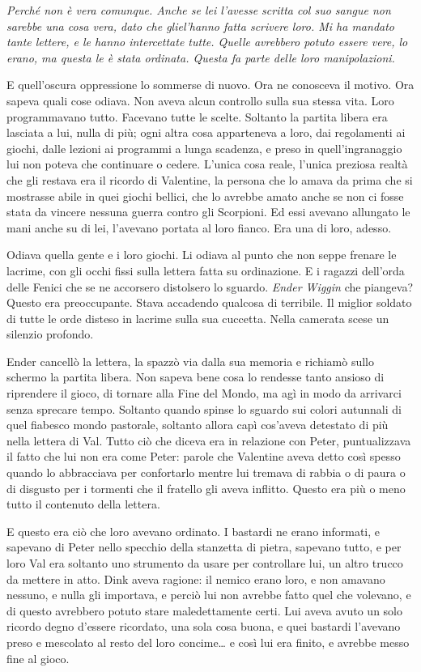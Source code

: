 \emph{{Perché non è vera comunque. Anche se lei l'avesse scritta col suo
		sangue non sarebbe una cosa vera, dato che gliel'hanno fatta scrivere
		loro. Mi ha mandato tante lettere, e le hanno intercettate tutte. Quelle
		avrebbero potuto essere vere, lo erano, ma questa le è stata ordinata.
		Questa fa parte delle loro manipolazioni.}}

{E quell'oscura oppressione lo sommerse di nuovo. Ora ne conosceva il
	motivo. Ora sapeva quali cose odiava. Non aveva alcun controllo sulla
	sua stessa vita. Loro programmavano tutto. Facevano tutte le scelte.
	Soltanto la partita libera era lasciata a lui, nulla di più; ogni altra
	cosa apparteneva a loro, dai regolamenti ai giochi, dalle lezioni ai
	programmi a lunga scadenza, e preso in quell'ingranaggio lui non poteva
	che continuare o cedere. L'unica cosa reale, l'unica preziosa realtà che
	gli restava era il ricordo di Valentine, la persona che lo amava da
	prima che si mostrasse abile in quei giochi bellici, che lo avrebbe
	amato anche se non ci fosse stata da vincere nessuna guerra contro gli
	Scorpioni. Ed essi avevano allungato le mani anche su di lei, l'avevano
	portata al loro fianco. Era una di loro, adesso.}

{Odiava quella gente e i loro giochi. Li odiava al punto che non seppe
	frenare le lacrime, con gli occhi fissi sulla lettera fatta su
	ordinazione. E i ragazzi dell'orda delle Fenici che se ne accorsero
	distolsero lo sguardo. \emph{Ender Wiggin} che piangeva? Questo era
	preoccupante. Stava accadendo qualcosa di terribile. Il miglior soldato
	di tutte le orde disteso in lacrime sulla sua cuccetta. Nella camerata
	scese un silenzio profondo.}

{Ender cancellò la lettera, la spazzò via dalla sua memoria e richiamò
	sullo schermo la partita libera. Non sapeva bene cosa lo rendesse tanto
	ansioso di riprendere il gioco, di tornare alla Fine del Mondo, ma agì
	in modo da arrivarci senza sprecare tempo. Soltanto quando spinse lo
	sguardo sui colori autunnali di quel fiabesco mondo pastorale, soltanto
	allora capì cos'aveva detestato di più nella lettera di Val. Tutto ciò
	che diceva era in relazione con Peter, puntualizzava il fatto che lui
	non era come Peter: parole che Valentine aveva detto così spesso quando
	lo abbracciava per confortarlo mentre lui tremava di rabbia o di paura o
	di disgusto per i tormenti che il fratello gli aveva inflitto. Questo
	era più o meno tutto il contenuto della lettera.}

{E questo era ciò che loro avevano ordinato. I bastardi ne erano
	informati, e sapevano di Peter nello specchio della stanzetta di pietra,
	sapevano tutto, e per loro Val era soltanto uno strumento da usare per
	controllare lui, un altro trucco da mettere in atto. Dink aveva ragione:
	il nemico erano loro, e non amavano nessuno, e nulla gli importava, e
	perciò lui non avrebbe fatto quel che volevano, e di questo avrebbero
	potuto stare maledettamente certi. Lui aveva avuto un solo ricordo degno
	d'essere ricordato, una sola cosa buona, e quei bastardi l'avevano preso
	e mescolato al resto del loro concime\ldots{} e così lui era finito, e
	avrebbe messo fine al gioco.}


